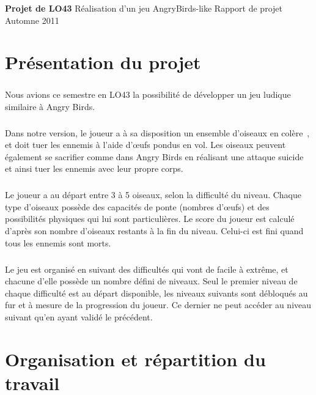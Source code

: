\documentclass[a4paper,12pt]{report}
\begin{document}
{\textbf{Projet de LO43}} %
{Réalisation d'un jeu AngryBirds-like} %
{Rapport de projet} %
{Automne 2011} %
{} %
{} %

\tableofcontents
\chapter{Présentation du projet}
\paragraph{}Nous avions ce semestre en LO43 la possibilité de développer un jeu ludique similaire à Angry Birds.

\paragraph{}Dans notre version, le joueur a à sa disposition un ensemble d'oiseaux \guillemotleft en colère\guillemotright~, et doit tuer les ennemis à l'aide d'œufs pondus en vol. Les oiseaux peuvent également se sacrifier comme dans Angry Birds en réalisant une \guillemotleft attaque suicide\guillemotright~ et ainsi tuer les ennemis avec leur propre corps.

\paragraph{}Le joueur a au départ entre 3 à 5 oiseaux, selon la difficulté du niveau. Chaque type d'oiseaux possède des capacités de ponte (nombres d'œufs) et des possibilités physiques qui lui sont particulières. Le score du joueur est calculé d'après son nombre d'oiseaux restants à la fin du niveau. Celui-ci est fini quand tous les ennemis sont morts.

\paragraph{}Le jeu est organisé en suivant des difficultés qui vont de facile à extrême, et chacune d'elle possède un nombre défini de niveaux. Seul le premier niveau de chaque difficulté est au départ disponible, les niveaux suivants sont débloqués au fur et à mesure de la progression du joueur. Ce dernier ne peut accéder au niveau suivant qu'en ayant validé le précédent.
 

\chapter{Organisation et répartition du travail}
\end{document}
